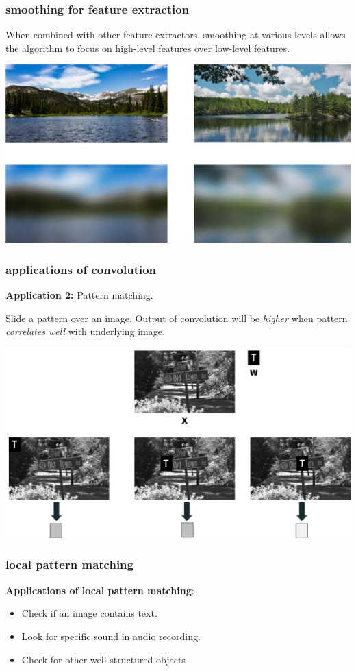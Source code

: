 \documentclass[handout,compress]{beamer}
\begin{document}
	\begin{frame}
	\frametitle{smoothing for feature extraction}
	When combined with other feature extractors, smoothing at various levels allows the algorithm to focus on high-level features over low-level features.
	\begin{center}
		\includegraphics[width=.9\textwidth]{blurred_compare.png}
	\end{center}
	\end{frame}

	\begin{frame}
	\frametitle{applications of convolution}
	\textbf{Application 2:} Pattern matching.
	
Slide a pattern over an image. Output of convolution will be \emph{higher} when pattern \emph{correlates well} with underlying image.
	\begin{center}
	\includegraphics[width=.9\textwidth]{matched_filter.png}
	\end{center}
	\end{frame}

	\begin{frame}
	\frametitle{local pattern matching}
	\textbf{Applications of local pattern matching}:
	\begin{itemize}
	\item Check if an image contains text.
	\item Look for specific sound in audio recording.
	\item Check for other well-structured objects
	\end{itemize}
	
	\end{frame}
\end{document}
